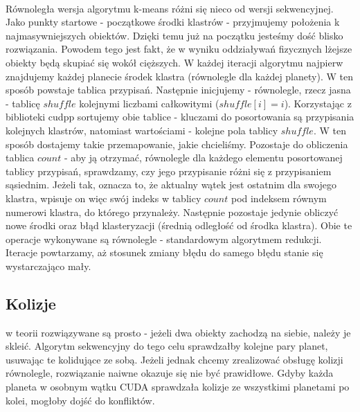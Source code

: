 \paragraph{} Równoległa wersja algorytmu k-means różni się nieco od wersji sekwencyjnej. Jako punkty startowe - początkowe środki klastrów - przyjmujemy położenia k najmasywniejszych obiektów. Dzięki temu już na początku jesteśmy dość blisko rozwiązania. Powodem tego jest fakt, że w wyniku oddziaływań fizycznych lżejsze obiekty będą skupiać się wokół cięższych. W każdej iteracji algorytmu najpierw znajdujemy każdej planecie środek klastra (równolegle dla każdej planety). W ten sposób powstaje tablica przypisań. Następnie inicjujemy - równolegle, rzecz jasna - tablicę $shuffle$ kolejnymi liczbami całkowitymi ($shuffle[i]=i$). Korzystając z biblioteki cudpp sortujemy obie tablice - kluczami do posortowania są przypisania kolejnych klastrów, natomiast wartościami - kolejne pola tablicy $shuffle$. W ten sposób dostajemy takie przemapowanie, jakie chcieliśmy. Pozostaje do obliczenia tablica $count$ - aby ją otrzymać, równolegle dla każdego elementu posortowanej tablicy przypisań, sprawdzamy, czy jego przypisanie różni się z przypisaniem sąsiednim. Jeżeli tak, oznacza to, że aktualny wątek jest ostatnim dla swojego klastra, wpisuje on więc swój indeks w tablicy $count$ pod indeksem równym numerowi klastra, do którego przynależy. Następnie pozostaje jedynie obliczyć nowe środki oraz błąd klasteryzacji (średnią odległość od środka klastra). Obie te operacje wykonywane są równolegle - standardowym algorytmem redukcji\cite{reduction}. Iteracje powtarzamy, aż stosunek zmiany błędu do samego błędu stanie się wystarczająco mały.

\subsection{Kolizje} w teorii rozwiązywane są prosto - jeżeli dwa obiekty zachodzą na siebie, należy je skleić. Algorytm sekwencyjny do tego celu sprawdzałby kolejne pary planet, usuwając te kolidujące ze sobą. Jeżeli jednak chcemy zrealizować obsługę kolizji równolegle, rozwiązanie naiwne okazuje się nie być prawidłowe. Gdyby każda planeta w osobnym wątku CUDA sprawdzała kolizje ze wszystkimi planetami po kolei, mogłoby dojść do konfliktów.

